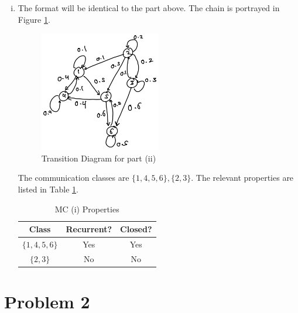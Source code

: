 \documentclass[12pt]{article}%
\begin{document}
\begin{enumerate}[i.]
  \item The format will be identical to the part above. The chain is portrayed in Figure \ref{fig:mc2}.

        \begin{figure}[h]
          \centering
          \includegraphics[width=0.5\textwidth]{mc2}
          \caption{Transition Diagram for part (ii)}
          \label{fig:mc2}
        \end{figure}
        The communication classes are $\{1,4,5,6\},\{2,3\}$. The relevant properties are listed in Table \ref{tab:mc2}.

        \begin{table}[htbp]
          \centering
          \begin{tabular}{|c|c|c|}
            \hline
            Class & Recurrent? & Closed? \\
            \hline
            $\{1,4,5,6\}$ & Yes & Yes \\
            \hline
            $\{2,3\}$ & No & No \\
             \hline
          \end{tabular}
          \caption{MC (i) Properties}
          \label{tab:mc2}
        \end{table}

\end{enumerate}


\section{Problem 2}
\label{sec:problem-2}
\end{document}
